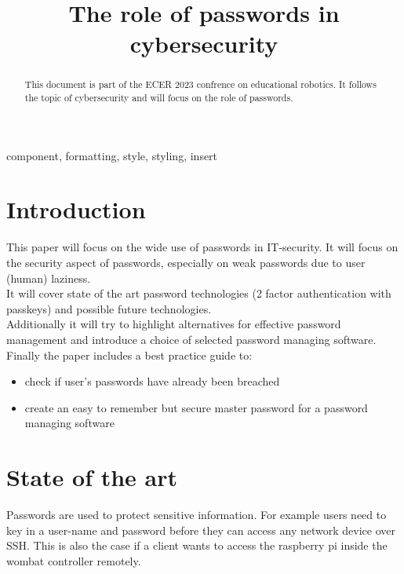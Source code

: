 \documentclass[conference]{IEEEtran}
\begin{document}
\title{The role of passwords in cybersecurity}

\author{
}

\maketitle

\begin{abstract}
This document is part of the ECER 2023 confrence on educational robotics. It follows the topic of cybersecurity and will focus on the role of passwords.
\end{abstract}
\vspace{2cm}
\begin{IEEEkeywords}
component, formatting, style, styling, insert
\end{IEEEkeywords}

\section{Introduction}
This paper will focus on the wide use of passwords in IT-security. It will focus on the security aspect of passwords, especially on weak passwords due to user (human) laziness. \\
It will cover state of the art password technologies (2 factor authentication with passkeys) and possible future technologies.\\
Additionally it will try to highlight alternatives for effective password management and introduce a choice of selected password managing software. \\
Finally the paper includes a best practice guide to:
\begin{itemize}
\item check if user's passwords have already been breached 
\item create an easy to remember but secure master password for a password managing software
\end{itemize} 


\section{State of the art}
Passwords are used to protect sensitive information. For example users need to key in a user-name and password before they can access any network device over SSH. This is also the case if a client wants to access the raspberry pi inside the wombat controller remotely. 
\end{document}
